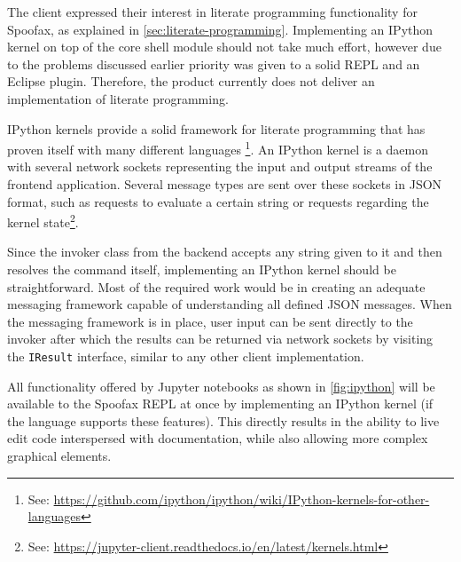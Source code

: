 The client expressed their interest in literate programming functionality for
Spoofax, as explained in \cref{sec:literate-programming}. Implementing an
IPython kernel on top of the core shell module should not take much effort,
however due to the problems discussed earlier priority was given to a solid
REPL and an Eclipse plugin. Therefore, the product currently does not deliver an
implementation of literate programming.

IPython kernels provide a solid framework for literate programming that has
proven itself with many different languages%
\footnote{See: \url{https://github.com/ipython/ipython/wiki/IPython-kernels-for-other-languages}}.
An IPython kernel is a daemon with several network sockets
representing the input and output streams of the frontend application. Several
message types are sent over these sockets in JSON format, such as requests to
evaluate a certain string or requests regarding the kernel
state\footnote{See: \url{https://jupyter-client.readthedocs.io/en/latest/kernels.html}}.

Since the invoker class from the backend accepts any string given to it and then
resolves the command itself, implementing an IPython kernel should be
straightforward. Most of the required work would be in creating an adequate
messaging framework capable of understanding all defined JSON messages. When the
messaging framework is in place, user input can be sent directly to the invoker
after which the results can be returned via network sockets by visiting the
\texttt{IResult} interface, similar to any other client implementation.

All functionality offered by Jupyter notebooks as shown in \cref{fig:ipython}
will be available to the Spoofax REPL at once by implementing an IPython kernel
(if the language supports these features). This directly results in the
ability to live edit code interspersed with documentation, while also allowing
more complex graphical elements.

